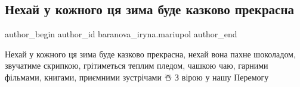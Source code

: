  
 
 
 
 

\subsection{Нехай у кожного ця зима буде казково прекрасна}
\label{sec:01_01_2023.fb.baranova_iryna.mariupol.1.nekhai_u_kozhnogo_ts}

\ifcmt
 author_begin
   author_id baranova_iryna.mariupol
 author_end
\fi

Нехай у кожного ця зима буде казково прекрасна, нехай вона пахне шоколадом,
звучатиме скрипкою, грітиметься теплим пледом, чашкою чаю, гарними фільмами,
книгами, приємними зустрічами ☃️ З вірою у нашу Перемогу 💙💛
